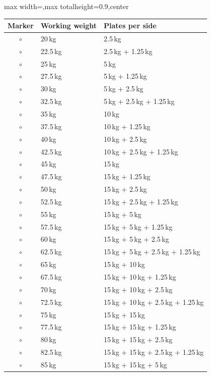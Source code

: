 \documentclass[11pt,a4paper]{article}
\newcommand{\tablearraystretch}{1.15}
\begin{document}
\begin{center}
\renewcommand{\arraystretch}{\tablearraystretch}
\begin{adjustbox}{max width=\linewidth,max totalheight=0.9\textheight,center}
\begin{tabular}{cll}
\toprule
Marker & Working weight & Plates per side \\
\midrule
$\circ$ & 20\,kg   & 2.5\,kg \\
$\circ$ & 22.5\,kg & 2.5\,kg + 1.25\,kg \\
$\circ$ & 25\,kg   & 5\,kg \\
$\circ$ & 27.5\,kg & 5\,kg + 1.25\,kg \\
$\circ$ & 30\,kg   & 5\,kg + 2.5\,kg \\
$\circ$ & 32.5\,kg & 5\,kg + 2.5\,kg + 1.25\,kg \\
$\circ$ & 35\,kg   & 10\,kg \\
$\circ$ & 37.5\,kg & 10\,kg + 1.25\,kg \\
$\circ$ & 40\,kg   & 10\,kg + 2.5\,kg \\
$\circ$ & 42.5\,kg & 10\,kg + 2.5\,kg + 1.25\,kg \\
$\circ$ & 45\,kg   & 15\,kg \\
$\circ$ & 47.5\,kg & 15\,kg + 1.25\,kg \\
$\circ$ & 50\,kg   & 15\,kg + 2.5\,kg \\
$\circ$ & 52.5\,kg & 15\,kg + 2.5\,kg + 1.25\,kg \\
$\circ$ & 55\,kg   & 15\,kg + 5\,kg \\
$\circ$ & 57.5\,kg & 15\,kg + 5\,kg + 1.25\,kg \\
$\circ$ & 60\,kg   & 15\,kg + 5\,kg + 2.5\,kg \\
$\circ$ & 62.5\,kg & 15\,kg + 5\,kg + 2.5\,kg + 1.25\,kg \\
$\circ$ & 65\,kg   & 15\,kg + 10\,kg \\
$\circ$ & 67.5\,kg & 15\,kg + 10\,kg + 1.25\,kg \\
$\circ$ & 70\,kg   & 15\,kg + 10\,kg + 2.5\,kg \\
$\circ$ & 72.5\,kg & 15\,kg + 10\,kg + 2.5\,kg + 1.25\,kg \\
$\circ$ & 75\,kg   & 15\,kg + 15\,kg \\
$\circ$ & 77.5\,kg & 15\,kg + 15\,kg + 1.25\,kg \\
$\circ$ & 80\,kg   & 15\,kg + 15\,kg + 2.5\,kg \\
$\circ$ & 82.5\,kg & 15\,kg + 15\,kg + 2.5\,kg + 1.25\,kg \\
$\circ$ & 85\,kg   & 15\,kg + 15\,kg + 5\,kg \\

\end{tabular}
\end{adjustbox}
\end{center}
\end{document}
